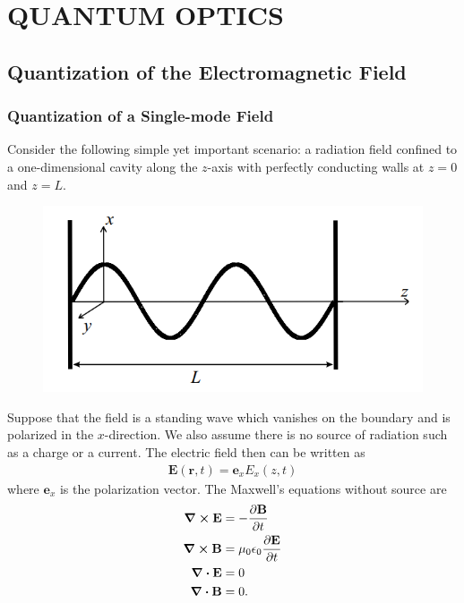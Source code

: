 \documentclass{book}
\theoremstyle{definition}
\newcommand{\p}{\partial}
\newcommand{\f}[2]{\frac{#1}{#2}}
\begin{document}
\chapter{QUANTUM OPTICS}

\newpage


\section{Quantization of the Electromagnetic Field}

\subsection{Quantization of a Single-mode Field}

Consider the following simple yet important scenario: a radiation field confined to a one-dimensional cavity along the $z$-axis with perfectly conducting walls at $z=0$ and $z=L$. 
\begin{figure}[!htb]
	\centering
	\includegraphics[scale=0.5]{em}
\end{figure}


Suppose that the field is a standing wave which vanishes on the boundary and is polarized in the $x$-direction. We also assume there is no source of radiation such as a charge or a current. The electric field then can be written as
\begin{align}
\mathbf{E}(\mathbf{r},t) = \mathbf{e}_xE_x(z,t)
\end{align}
where $\mathbf{e}_x$ is the polarization vector. The Maxwell's equations without source are
\begin{align}
\curl{\mathbf{E}} &= -\f{\p \mathbf{B}}{\p t}\\
\curl{\mathbf{B}} &= \mu_0\epsilon_0\f{\p \mathbf{E}}{\p t}\\
\div{\mathbf{E}} &= 0\\
\div{\mathbf{B}} &= 0.
\end{align}
\end{document}
